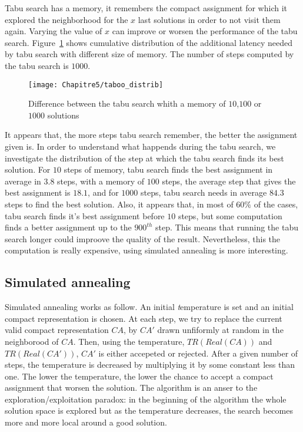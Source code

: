 Tabu search has a memory, it remembers the compact assignment for which it explored the neighborhood for the $x$ last solutions in order to not visit them again. Varying the value of $x$ can improve or worsen the performance of the tabu search.
Figure~\ref{fig:tabudistrib} shows cumulative distribution of the additional latency needed by tabu search with different size of memory. The number of steps computed by the tabu search is $1000$.
\begin{figure}[h]
	\centering
	\texttt{[image: Chapitre5/taboo\_distrib]}
\caption{ Difference between the tabu search whith a memory of $10$,$100$ or $1000$ solutions}
\label{fig:tabudistrib}
\end{figure}
It appears that, the more steps tabu search remember, the better the assignment given is.
In order to understand what happends during the tabu search, we investigate the distribution of the step at which the tabu search finds its best solution.
For $10$ steps of memory, tabu search finds the best assignment in average in $3.8$ steps, with a memory of $100$ steps, the average step that gives the best assignment is $18.1$, and for $1000$ steps, tabu search needs in average $84.3$ steps to find the best solution. 
Also, it appears that, in most of $60\%$ of the cases, tabu search finds it's best assignment before $10$ steps, but some computation finds a better assignment up to the $900^{th}$ step. This means that running the tabu search longer could improove the quality of the result. Nevertheless, this the computation is really expensive, using simulated annealing is more interesting.

\subsection{Simulated annealing}\label{sec:recuit}

Simulated annealing works as follow. An initial {\emph temperature} is set and an initial compact representation is chosen. At each step, we try to replace the current valid compact representation $CA$, by $CA'$ drawn unfiformly at random in the neighborood of $CA$. Then, using the temperature, $TR(Real(CA))$ and $TR(Real(CA'))$, $CA'$ is either accepeted or rejected. After a given number of steps, the temperature is decreased by multiplying it by some constant less than one. The lower the temperature, the lower the chance to accept a compact assignment that worsen the solution. The algorithm is an anser to the exploration/exploitation paradox: in the beginning of the algorithm the whole solution space is explored but as the temperature decreases, the search becomes more and more local around a good solution.

